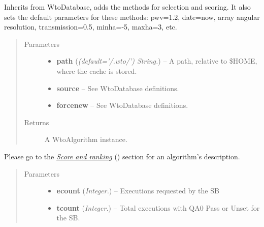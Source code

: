 \documentclass[a4paper,10pt,english]{sphinxmanual}
\begin{document}
\begin{fulllineitems}
\label{wtoapi:wtoAlgorithm.WtoAlgorithm}
Inherits from WtoDatabase, adds the methods for selection and scoring.
It also sets the default parameters for these methods: pwv=1.2, date=now,
array angular resolution, transmission=0.5, minha=-5, maxha=3, etc.
\begin{quote}\begin{description}
\item[{Parameters}] \leavevmode\begin{itemize}
\item {} 
\textbf{path} (\emph{(default='/.wto/') String.}) -- A path, relative to \$HOME, where the cache is stored.

\item {} 
\textbf{source} -- See WtoDatabase definitions.

\item {} 
\textbf{forcenew} -- See WtoDatabase definitions.

\end{itemize}

\item[{Returns}] \leavevmode
A WtoAlgorithm instance.

\end{description}\end{quote}

\begin{fulllineitems}
\label{wtoapi:wtoAlgorithm.WtoAlgorithm.calculate_score}
Please go to the {\hyperref[algorithm:score]{\emph{Score and ranking}}} () section for an
algorithm's description.
\begin{quote}\begin{description}
\item[{Parameters}] \leavevmode\begin{itemize}
\item {} 
\textbf{ecount} (\emph{Integer.}) -- Executions requested by the SB

\item {} 
\textbf{tcount} (\emph{Integer.}) -- Total executions with QA0 Pass or Unset for the SB.


\end{itemize}
\end{description}
\end{quote}
\end{fulllineitems}
\end{fulllineitems}
\end{document}
